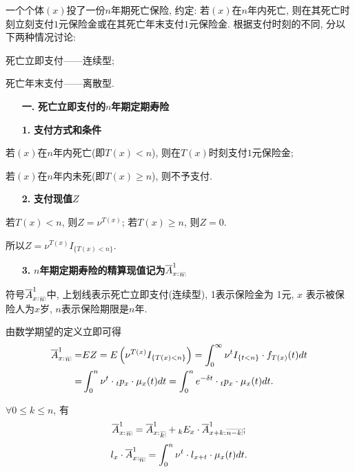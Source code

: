 \documentclass[a4paper,openany, 10pt]{ctexbook}
\makeatletter
\newcommand{\hei}{\CJKfamily{hei}}      %
\DeclareRobustCommand{\annu}[1]{_{%
    \def\arraystretch{0}%
    \setlength\arraycolsep{1pt}%
    \setlength\arrayrulewidth{.2pt}%
    \begin{array}[b]{@{}c|}\hline
        \\[\arraycolsep]%
        \scriptstyle #1%
    \end{array}%
}}
\makeatother
\begin{document}
一个个体$(x)$投了一份$n$年期死亡保险, 约定: 若$(x)$在$n$年内死亡, 则在其死亡时刻立刻支付$1$元保险金或在其死亡年末支付$1$元保险金. 根据支付时刻的不同, 分以下两种情况讨论:

死亡立即支付——连续型;

死亡年末支付——离散型.
\begin{itemize}
    \item[{\bf\hei 一.}]{\bf\hei 死亡立即支付的$n$年期定期寿险}
\end{itemize}
\begin{itemize}
    \item[{\bf\hei 1.}]{\bf\hei 支付方式和条件}
\end{itemize}

若$(x)$在$n$年内死亡(即$T(x)<n$), 则在$T(x)$时刻支付$1$元保险金;

若$(x)$在$n$年内未死(即$T(x)\geqslant n$), 则不予支付.
\begin{itemize}
    \item[{\bf\hei 2.}]{\bf\hei 支付现值$Z$}
\end{itemize}

若$T(x)<n$, 则$Z=\nu^{T(x)}$; 若$T(x)\geqslant n$, 则$Z=0$.

所以$Z=\nu^{T(x)}I_{\{T(x)<n\}}.$
\begin{itemize}
    \item[{\bf\hei 3.}]{\bf\hei $n$年期定期寿险的精算现值记为$\overline{A}_{x:}^1{}_{{}\annu{n}}$}
\end{itemize}
\begin{remark}
    符号$\overline{A}_{x:}^1{}_{{}\annu{n}}$中, 上划线表示死亡立即支付(连续型), 1表示保险金为
    1元, $x$ 表示被保险人为$x$岁, $n$表示保险期限是$n$年.
\end{remark}

由数学期望的定义立即可得
\begin{align*}
        \overline{A}_{x:}^1{}_{{}\annu{n}}= & EZ=E\left( \nu^{T\left( x \right)}I_{\left\{ T\left( x \right) <n \right\}} \right) =\int_0^{\infty}{\nu^{t}I_{\left\{ t <n \right\}}\cdot f_{T(x)}(t)dt} \\
        =                            & \int_0^{n}{\nu^{t}\cdot {}_tp_x\cdot \mu_{x}(t)dt}=\int_0^{n}{e^{-\delta t}\cdot {}_tp_x\cdot \mu_{x}(t)dt}.
    \end{align*}
\begin{proposition}
    $\forall 0\leqslant k\leqslant n$, 有
    \begin{align}\label{eq2.3}
        \overline{A}_{x:}^1{}_{{}\annu{n}}=\overline{A}_{x:}^1{}_{\annu k}+{}_kE_x\cdot\overline{A}_{x+k:}^1{}\annu{n-k};
    \end{align}
    \begin{align}\label{eq2.4}
        l_x\cdot\overline{A}_{x:\annu{n}}^1=\int_0^{n}{\nu^{t}\cdot l_{x+t}\cdot \mu_{x}(t)dt}.
    \end{align}
\end{proposition}
\end{document}
